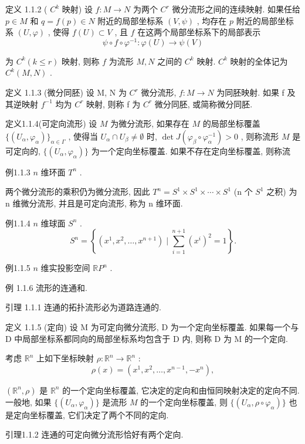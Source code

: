 \documentclass[]{article}
\begin{document}
定义 1.1.2 ( $C^k$ 映射) 设 $f: M \to N$ 为两个 $C^r$ 微分流形之间的连续映射. 如果任给 $p \in M$ 和 $q = f(p) \in N$ 附近的局部坐标系 $(V, \psi)$ , 均存在 $p$ 附近的局部坐标系 $(U, \varphi)$ , 使得 $f(U) \subset V$ , 且 $f$ 在这两个局部坐标系下的局部表示 $$
\psi \circ f \circ \varphi^ {- 1}: \varphi (U) \rightarrow \psi (V)
$$

为 $C^k (k\leqslant r)$ 映射, 则称 $f$ 为流形 $M,N$ 之间的 $C^k$ 映射. $C^k$ 映射的全体记为 $C^k (M,N)$ . 

定义 1.1.3 (微分同胚) 设 M, N 为 $C^{r}$ 微分流形, $f: M \to N$ 为同胚映射. 如果 f 及其逆映射 $f^{-1}$ 均为 $C^{r}$ 映射, 则称 f 为 $C^{r}$ 微分同胚, 或简称微分同胚. 

定义1.1.4(可定向流形) 设 $M$ 为微分流形, 如果存在 $M$ 的局部坐标覆盖 $\{(U_{\alpha}, \varphi_{\alpha})\}_{\alpha \in \Gamma}$ , 使得当 $U_{\alpha} \cap U_{\beta} \neq \emptyset$ 时, $\det J(\varphi_{\beta} \circ \varphi_{\alpha}^{-1}) > 0$ , 则称流形 $M$ 是可定向的, $\{(U_{\alpha}, \varphi_{\alpha})\}$ 为一个定向坐标覆盖. 如果不存在定向坐标覆盖, 则称流

例1.1.3 $n$ 维环面 $T^n$ . 

两个微分流形的乘积仍为微分流形, 因此 $T^{n} = S^{1} \times S^{1} \times \cdots \times S^{1}$ (n 个 $S^{1}$ 之积) 为 n 维微分流形, 并且是可定向流形, 称为 n 维环面. 


例1.1.4 $n$ 维球面 $S^n$ .$$
S ^ {n} = \left\{\left(x ^ {1}, x ^ {2}, \dots , x ^ {n + 1}\right) \mid \sum_ {i = 1} ^ {n + 1} \left(x ^ {i}\right) ^ {2} = 1 \right\}.
$$

 例1.1.5 $n$ 维实投影空间 $\mathbb{R}P^n$ . 

例 1.1.6 流形的连通和. 

引理 1.1.1 连通的拓扑流形必为道路连通的. 

定义 1.1.5 (定向) 设 M 为可定向微分流形, D 为一个定向坐标覆盖. 如果每一个与 D 中局部坐标系都同向的局部坐标系均包含于 D 内, 则称 D 为 M 的一个定向. 

考虑 $\mathbb{R}^n$ 上如下坐标映射 $\rho : \mathbb{R}^n \to \mathbb{R}^n$ :$$
\rho (x) = \left(x ^ {1}, x ^ {2}, \dots , x ^ {n - 1}, - x ^ {n}\right),
$$ 

$(\mathbb{R}^n, \rho)$ 是 $\mathbb{R}^n$ 的一个定向坐标覆盖, 它决定的定向和由恒同映射决定的定向不同. 一般地, 如果 $\{(U_\alpha, \varphi_\alpha)\}$ 是流形 $M$ 的一个定向坐标覆盖, 则 $\{(U_\alpha, \rho \circ \varphi_\alpha)\}$ 也是定向坐标覆盖, 它们决定了两个不同的定向. 

引理1.1.2 连通的可定向微分流形恰好有两个定向. 
\end{document}
